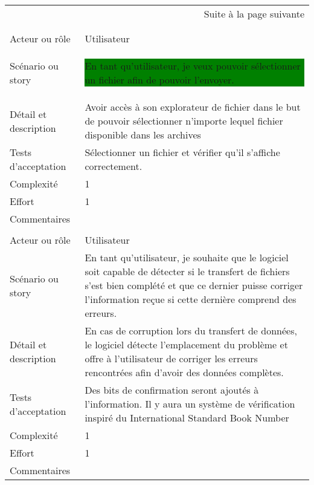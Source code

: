\begin{longtable}{|l|p{}|}
\multicolumn{2}{r}{Suite à la page suivante} \\
\endfoot

\multicolumn{2}{r}{} \\
\endlastfoot

\hline
    \rowcolor{Gray}
    \multicolumn{2}{|l|}{1} \\
\hline
    Acteur ou rôle & Utilisateur \\
\hline
    Scénario ou story & \colorbox{Green}{\parbox{14.5cm}{En tant qu'utilisateur, 
      je veux pouvoir sélectionner un fichier
      afin de pouvoir l'envoyer.}} \\
\hline
    Détail et description & 
    Avoir accès à son explorateur de fichier dans le but de pouvoir sélectionner n'importe lequel fichier disponible dans les archives \\
       
\hline
    Tests d'acceptation & Sélectionner un fichier et vérifier qu'il s'affiche correctement. \\
\hline
    Complexité & 1 \\
\hline
    Effort & 1 \\
\hline
    Commentaires &  \\

\hline
    \rowcolor{Gray}
    \multicolumn{2}{|l|}{2} \\
\hline
    Acteur ou rôle & Utilisateur \\
\hline
    Scénario ou story & En tant qu'utilisateur,
          je souhaite que le logiciel soit capable de détecter
          si le transfert de fichiers s'est bien complété et que
          ce dernier puisse corriger l'information reçue si cette
          dernière comprend des erreurs.\\
\hline
    Détail et description & En cas de corruption lors du transfert de données, le logiciel détecte l'emplacement du problème et offre à l'utilisateur de corriger les erreurs rencontrées afin d'avoir des données complètes.\\
\hline
    Tests d'acceptation & Des bits de confirmation seront ajoutés à l'information. Il y aura un système de vérification inspiré du International Standard Book Number\\
\hline
    Complexité & 1 \\
\hline
    Effort & 1 \\
\hline
    Commentaires &  \\


\end{longtable}
